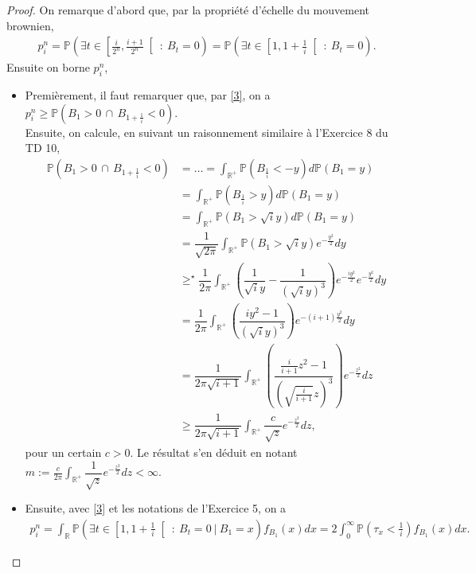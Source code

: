 \documentclass{article}
\theoremstyle{definition}
\numberwithin{equation}{section}
\DeclareMathOperator{\R}{\mathbb{R}}
\begin{document}
\begin{proof}
On remarque d'abord que, par la propriété d'échelle du mouvement brownien,
\begin{align}
    \label{3}
     p^n_i=\mathbb{P}\left(\exists t\in \left[\frac{i}{2^n},\frac{i+1}{2^n}\right[~:~ B_t=0\right)= \mathbb{P}\left(\exists t \in \left[1,1+\frac{1}{i}\right[~:~B_t=0\right).
\end{align}
Ensuite on borne $p^n_i$,
\begin{itemize}
    \item[$m$ :] Premièrement, il faut remarquer que, par \eqref{3}, on a $p^n_i\geq \mathbb{P}(B_1>0\,\cap \, B_{1+\frac{1}{i}}<0)$.\\
    Ensuite, on calcule, en suivant un raisonnement similaire à l'Exercice 8 du TD 10,
    \begin{align*}
        \mathbb{P}(B_1>0\,\cap \, B_{1+\frac{1}{i}}<0) &=\dots 
        =\int_{\R^+}\mathbb{P}(B_{\frac{1}{i}}<-y)d\mathbb{P}(B_1=y)\\
        &=\int_{\R^+}\mathbb{P}(B_{\frac{1}{i}}>y)d\mathbb{P}(B_1=y)\\
        &=\int_{\R^+}\mathbb{P}(B_1>\sqrt{i}y)d\mathbb{P}(B_1=y)\\
        &=\dfrac{1}{\sqrt{2\pi}}\int_{\R^+} \mathbb{P}(B_1>\sqrt{i}y) e^{-\frac{y^2}{2}}dy\\
        &\geq^\star \dfrac{1}{2\pi}\int_{\R^+} \left(\dfrac{1}{\sqrt{i}y}-\dfrac{1}{(\sqrt{i}y)^3}\right) e^{-\frac{iy^2}{2}}e^{-\frac{y^2}{2}}dy\\
        &= \dfrac{1}{2\pi}\int_{\R^+} \left(\dfrac{iy^2-1}{(\sqrt{i}y)^3}\right) e^{-(i+1)\frac{y^2}{2}}dy\\
        &= \dfrac{1}{2\pi\sqrt{i+1}}\int_{\R^+} \left(\dfrac{\frac{i}{i+1}z^2-1}{(\sqrt{\frac{i}{i+1}}z)^3}\right) e^{-\frac{z^2}{2}}dz\\
        &\geq  \dfrac{1}{2\pi\sqrt{i+1}}\int_{\R^+}\dfrac{c}{\sqrt{z}}e^{-\frac{z^2}{2}}dz,
    \end{align*}
    pour un certain $c>0$. Le résultat s'en déduit en notant $m:=\frac{c}{2\pi}\int_{\R^+}\dfrac{1}{\sqrt{z}}e^{-\frac{z^2}{2}}dz<\infty$.
    \item[$M$ :] Ensuite, avec \eqref{3} et les notations de l'Exercice 5, on a
    \begin{align}
        \label{4}
        p^n_i  = \int_{\R}\mathbb{P}\left(\exists t \in \left[1,1+\frac{1}{i}\right[~:~B_t=0~|~B_1=x\right)f_{B_1}(x)dx = 2\int_0^\infty \mathbb{P}\left(\tau_x<\frac{1}{i}\right)f_{B_1}(x)dx. 
    \end{align}

\end{itemize}
\end{proof}
\end{document}
